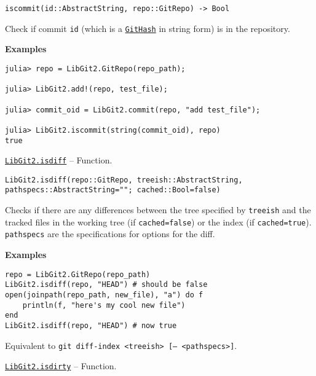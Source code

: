 \begin{adjustwidth}{2em}{0pt}


\begin{verbatim}
iscommit(id::AbstractString, repo::GitRepo) -> Bool
\end{verbatim}

Check if commit \texttt{id} (which is a \hyperlink{202290709580230708}{\texttt{GitHash}} in string form) is in the repository.

\textbf{Examples}


\begin{verbatim}
julia> repo = LibGit2.GitRepo(repo_path);

julia> LibGit2.add!(repo, test_file);

julia> commit_oid = LibGit2.commit(repo, "add test_file");

julia> LibGit2.iscommit(string(commit_oid), repo)
true
\end{verbatim}



\end{adjustwidth}
\hypertarget{3509758867865957563}{} 
\hyperlink{3509758867865957563}{\texttt{LibGit2.isdiff}}  -- {Function.}

\begin{adjustwidth}{2em}{0pt}


\begin{verbatim}
LibGit2.isdiff(repo::GitRepo, treeish::AbstractString, pathspecs::AbstractString=""; cached::Bool=false)
\end{verbatim}

Checks if there are any differences between the tree specified by \texttt{treeish} and the tracked files in the working tree (if \texttt{cached=false}) or the index (if \texttt{cached=true}). \texttt{pathspecs} are the specifications for options for the diff.

\textbf{Examples}


\begin{verbatim}
repo = LibGit2.GitRepo(repo_path)
LibGit2.isdiff(repo, "HEAD") # should be false
open(joinpath(repo_path, new_file), "a") do f
    println(f, "here's my cool new file")
end
LibGit2.isdiff(repo, "HEAD") # now true
\end{verbatim}

Equivalent to \texttt{git diff-index <treeish> [-- <pathspecs>]}.



\end{adjustwidth}
\hypertarget{7941935372196782184}{} 
\hyperlink{7941935372196782184}{\texttt{LibGit2.isdirty}}  -- {Function.}

